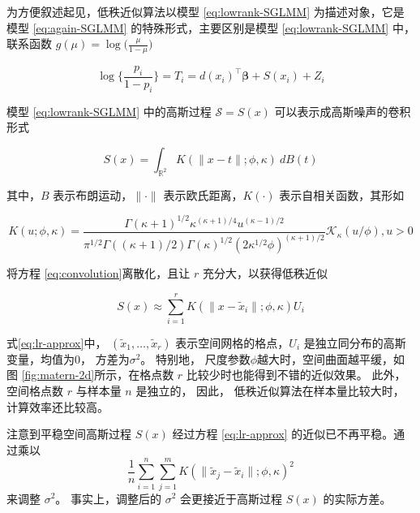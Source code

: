 \documentclass[12pt,a4paper,UTF8,twoside]{book}
\theoremstyle{definition}
\theoremstyle{definition}
\theoremstyle{definition}
\theoremstyle{remark}
\begin{document}
为方便叙述起见，低秩近似算法以模型 \eqref{eq:lowrank-SGLMM} 为描述对象，它是模型 \eqref{eq:again-SGLMM} 的特殊形式，主要区别是模型 \eqref{eq:lowrank-SGLMM} 中，联系函数 \(g(\mu) = \log\big(\frac{\mu}{1-\mu}\big)\)

\begin{equation}
\log\{\frac{p_i}{1-p_i}\}  = T_{i} = d(x_i)^{\top}\boldsymbol{\beta} + S(x_i) + Z_{i} \label{eq:lowrank-SGLMM}
\end{equation}

\noindent 模型 \eqref{eq:lowrank-SGLMM} 中的高斯过程 \(\mathcal{S} = S(x)\) 可以表示成高斯噪声的卷积形式

\begin{equation}
S(x) = \int_{\mathbb{R}^2} K(\|x-t\|; \phi, \kappa) \: d B(t) \label{eq:convolution}
\end{equation}

\noindent 其中，\(B\) 表示布朗运动，\(\|\cdot\|\) 表示欧氏距离，\(K(\cdot)\) 表示自相关函数，其形如

\begin{equation}
K(u; \phi, \kappa) = \frac{\Gamma(\kappa + 1)^{1/2}\kappa^{(\kappa+1)/4}u^{(\kappa-1)/2}}{\pi^{1/2}\Gamma((\kappa+1)/2)\Gamma(\kappa)^{1/2}(2\kappa^{1/2}\phi)^{(\kappa+1)/2}}\mathcal{K}_{\kappa}(u/\phi), u > 0 \label{eq:matern-kernel}
\end{equation}

\noindent 将方程 \eqref{eq:convolution}离散化，且让 \(r\) 充分大，以获得低秩近似 \citep{PrevMap2017JSS}

\begin{equation}
S(x) \approx \sum_{i = 1}^r K(\|x-\tilde{x}_{i}\|; \phi, \kappa) U_{i} \label{eq:lr-approx}
\end{equation}

\noindent 式\eqref{eq:lr-approx}中， \((\tilde{x}_{1},\ldots,\tilde{x}_{r})\) 表示空间网格的格点，\(U_{i}\) 是独立同分布的高斯变量，均值为\(0\)， 方差为\(\sigma^2\)。 特别地， 尺度参数\(\phi\)越大时，空间曲面越平缓，如图 \ref{fig:matern-2d}所示，在格点数 \(r\) 比较少时也能得到不错的近似效果。 此外， 空间格点数 \(r\) 与样本量 \(n\) 是独立的， 因此， 低秩近似算法在样本量比较大时， 计算效率还比较高。

注意到平稳空间高斯过程 \(S(x)\) 经过方程 \eqref{eq:lr-approx} 的近似已不再平稳。通过乘以 \[\frac{1}{n}\sum_{i = 1}^n \sum_{j = 1}^m K(\|\tilde{x}_{j}-\tilde{x}_{i}\|; \phi, \kappa)^2\] 来调整 \(\sigma^2\)。 事实上，调整后的 \(\sigma^2\) 会更接近于高斯过程 \(S(x)\) 的实际方差。
\end{document}
